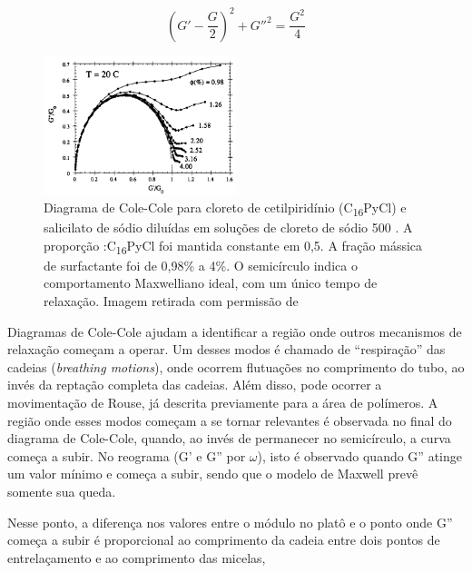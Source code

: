 		\begin{equation}
			\left(G' - \frac{G}{2}\right)^2 + G''^2 = \frac{G^2}{4}
			\label{eqn:cole_cole}
		\end{equation} 
		
		\begin{figure}[h]
			\centering
			\includegraphics[width=0.5\textwidth]{imagens/artigos/ColeCole_Berret_Appel_Porte_1993}
			\caption{Diagrama de Cole-Cole para cloreto de cetilpiridínio (C\textsubscript{16}PyCl) e salicilato de sódio diluídas em soluções de cloreto de sódio 500 \mM. A proporção \Sal:C\textsubscript{16}PyCl foi mantida constante em 0,5. A fração mássica de surfactante foi de 0,98\% a 4\%. O semicírculo indica o comportamento Maxwelliano ideal, com um único tempo de relaxação. Imagem retirada com permissão de \citeauthor{Berret1993a}}
			\label{fig:colecole_berret}
		\end{figure}

		 
		
		Diagramas de Cole-Cole ajudam a identificar a região onde outros mecanismos de relaxação começam a operar. Um desses modos é chamado de ``respiração'' das cadeias (\emph{breathing motions}), onde ocorrem flutuações no comprimento do tubo, ao invés da reptação completa das cadeias. Além disso, pode ocorrer a movimentação de Rouse, já descrita previamente para a área de polímeros. \cite{Granek1992}
		A região onde esses modos começam a se tornar relevantes é observada no final do diagrama de Cole-Cole, quando, ao invés de permanecer no semicírculo, a curva começa a subir. No reograma (G' e G'' por \(\omega\)), isto é observado quando G'' atinge um valor mínimo e começa a subir, sendo que o modelo de Maxwell prevê somente sua queda.
		
		Nesse ponto, a diferença nos valores entre o módulo no platô e o ponto onde G'' começa a subir é proporcional ao comprimento da cadeia entre dois pontos de entrelaçamento e ao comprimento das micelas, \cite{Berret1993a} 
		
